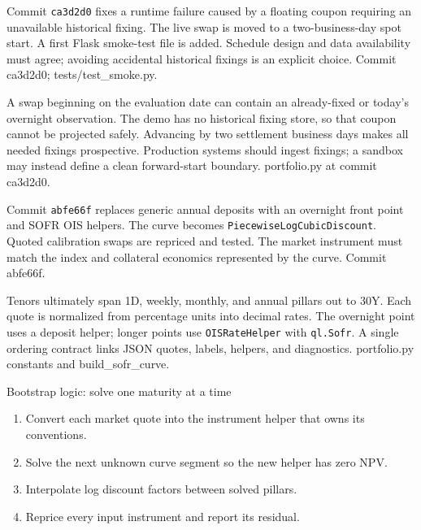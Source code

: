 
{Commit \texttt{ca3d2d0} fixes a runtime failure caused by a floating coupon requiring an unavailable historical fixing.}
{The live swap is moved to a two-business-day spot start.}
{A first Flask smoke-test file is added.}
{Schedule design and data availability must agree; avoiding accidental historical fixings is an explicit choice.}
{Commit ca3d2d0; tests/test\_smoke.py.}

{A swap beginning on the evaluation date can contain an already-fixed or today's overnight observation.}
{The demo has no historical fixing store, so that coupon cannot be projected safely.}
{Advancing by two settlement business days makes all needed fixings prospective.}
{Production systems should ingest fixings; a sandbox may instead define a clean forward-start boundary.}
{portfolio.py at commit ca3d2d0.}

{Commit \texttt{abfe66f} replaces generic annual deposits with an overnight front point and SOFR OIS helpers.}
{The curve becomes \texttt{PiecewiseLogCubicDiscount}.}
{Quoted calibration swaps are repriced and tested.}
{The market instrument must match the index and collateral economics represented by the curve.}
{Commit abfe66f.}

{Tenors ultimately span 1D, weekly, monthly, and annual pillars out to 30Y.}
{Each quote is normalized from percentage units into decimal rates.}
{The overnight point uses a deposit helper; longer points use \texttt{OISRateHelper} with \texttt{ql.Sofr}.}
{A single ordering contract links JSON quotes, labels, helpers, and diagnostics.}
{portfolio.py constants and build\_sofr\_curve.}

\begin{frame}{Bootstrap logic: solve one maturity at a time}
  \begin{enumerate}\setlength\itemsep{0.8em}
    \item Convert each market quote into the instrument helper that owns its conventions.
    \item Solve the next unknown curve segment so the new helper has zero NPV.
    \item Interpolate log discount factors between solved pillars.
    \item Reprice every input instrument and report its residual.
  \end{enumerate}
\end{frame}

